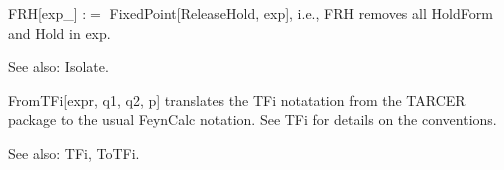 




FRH[exp\_{}] :\(=\) FixedPoint[ReleaseHold, exp], i.e., FRH removes all HoldForm and Hold in exp.

See also:  Isolate.












FromTFi[expr, q1, q2, p] translates the TFi notatation from the TARCER package to the usual FeynCalc notation. See TFi for details on the
  conventions.

See also: TFi, ToTFi.






